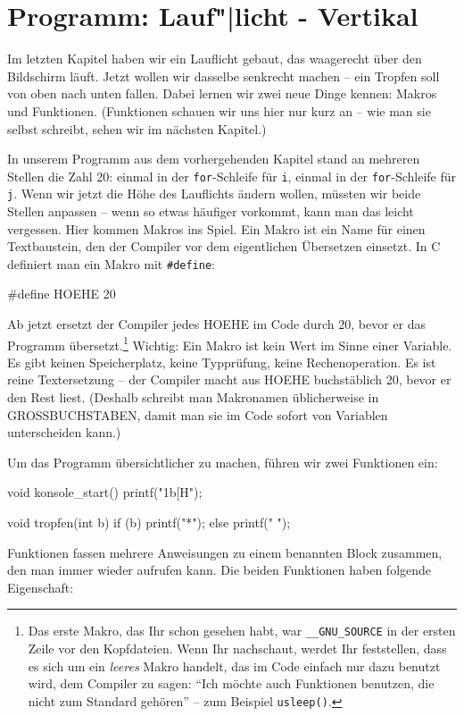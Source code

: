 \section{Programm: Lauf"|licht - Vertikal}
\label{sec:c:lauflicht-vertikal}

Im letzten Kapitel haben wir ein Lauflicht gebaut, das waagerecht über den Bildschirm läuft. Jetzt wollen wir dasselbe senkrecht machen -- ein Tropfen soll von oben nach unten fallen. Dabei lernen wir zwei neue Dinge kennen: Makros und Funktionen. (Funktionen schauen wir uns hier nur kurz an -- wie man sie selbst schreibt, sehen wir im nächsten Kapitel.)

In unserem Programm aus dem vorhergehenden Kapitel stand an mehreren Stellen die Zahl 20: einmal in der \texttt{for}-Schleife für \texttt{i}, einmal in der \texttt{for}-Schleife für \texttt{j}. Wenn wir jetzt die Höhe des Lauflichts ändern wollen, müssten wir beide Stellen anpassen -- wenn so etwas häufiger vorkommt, kann man das leicht vergessen. Hier kommen Makros ins Spiel. Ein Makro ist ein Name für einen Textbaustein, den der Compiler vor dem eigentlichen Übersetzen einsetzt. In C definiert man ein Makro mit \texttt{\#define}:
\begin{code}[numbers=none]
#define HOEHE 20
\end{code}
Ab jetzt ersetzt der Compiler jedes HOEHE im Code durch 20, bevor er das Programm übersetzt.\footnote{%
    Das erste Makro, das Ihr schon gesehen habt, war \texttt{\_\_GNU\_SOURCE} in der ersten Zeile vor den Kopfdateien. Wenn Ihr nachschaut, werdet Ihr feststellen, dass es sich um ein \emph{leeres} Makro handelt, das im Code einfach nur dazu benutzt wird, dem Compiler zu sagen: \enquote{Ich möchte auch Funktionen benutzen, die nicht zum Standard gehören} -- zum Beispiel \texttt{usleep()}.}
Wichtig: Ein Makro ist kein Wert im Sinne einer Variable. Es gibt keinen Speicherplatz, keine Typprüfung, keine Rechenoperation. Es ist reine Textersetzung -- der Compiler macht aus HOEHE buchstäblich 20, bevor er den Rest liest. (Deshalb schreibt man Makronamen üblicherweise in GROSSBUCHSTABEN, damit man sie im Code sofort von Variablen unterscheiden kann.)

Um das Programm übersichtlicher zu machen, führen wir zwei Funktionen ein:
\begin{code}[numbers=none]
void konsole_start() { 
    printf("\x1b[H"); 
}

void tropfen(int b) {
    if (b)
        printf("*");
    else
        printf(" ");
}
\end{code}
Funktionen fassen mehrere Anweisungen zu einem benannten Block zusammen, den man immer wieder aufrufen kann. Die beiden Funktionen haben folgende Eigenschaft:

